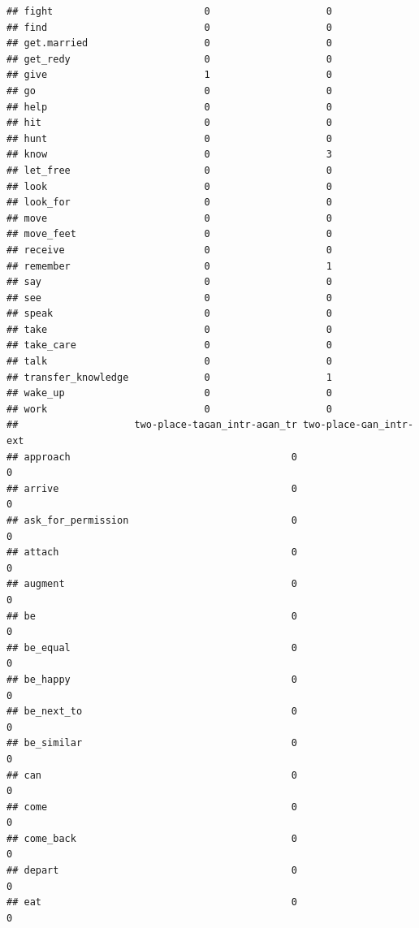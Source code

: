 \documentclass[
]{article}
\begin{document}
\begin{verbatim}
## fight                          0                    0
## find                           0                    0
## get.married                    0                    0
## get_redy                       0                    0
## give                           1                    0
## go                             0                    0
## help                           0                    0
## hit                            0                    0
## hunt                           0                    0
## know                           0                    3
## let_free                       0                    0
## look                           0                    0
## look_for                       0                    0
## move                           0                    0
## move_feet                      0                    0
## receive                        0                    0
## remember                       0                    1
## say                            0                    0
## see                            0                    0
## speak                          0                    0
## take                           0                    0
## take_care                      0                    0
## talk                           0                    0
## transfer_knowledge             0                    1
## wake_up                        0                    0
## work                           0                    0
##                    two-place-taɢan_intr-aɢan_tr two-place-ɢan_intr-ext
## approach                                      0                      0
## arrive                                        0                      0
## ask_for_permission                            0                      0
## attach                                        0                      0
## augment                                       0                      0
## be                                            0                      0
## be_equal                                      0                      0
## be_happy                                      0                      0
## be_next_to                                    0                      0
## be_similar                                    0                      0
## can                                           0                      0
## come                                          0                      0
## come_back                                     0                      0
## depart                                        0                      0
## eat                                           0                      0

\end{verbatim}
\end{document}
